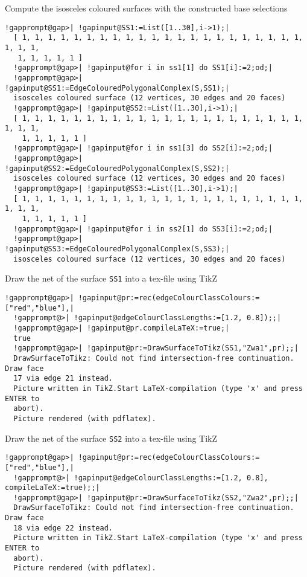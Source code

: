 \documentclass[a4paper,11pt]{report}
\begin{document}
{{ Compute the isosceles coloured surfaces with the constructed base selections 
\begin{Verbatim}[commandchars=!@|,fontsize=\small,frame=single,label=Example]
  !gapprompt@gap>| !gapinput@SS1:=List([1..30],i->1);|
  [ 1, 1, 1, 1, 1, 1, 1, 1, 1, 1, 1, 1, 1, 1, 1, 1, 1, 1, 1, 1, 1, 1, 1, 1, 1, 
   1, 1, 1, 1, 1 ]
  !gapprompt@gap>| !gapinput@for i in ss1[1] do SS1[i]:=2;od;|
  !gapprompt@gap>| !gapinput@SS1:=EdgeColouredPolygonalComplex(S,SS1);|
  isosceles coloured surface (12 vertices, 30 edges and 20 faces)
  !gapprompt@gap>| !gapinput@SS2:=List([1..30],i->1);|
  [ 1, 1, 1, 1, 1, 1, 1, 1, 1, 1, 1, 1, 1, 1, 1, 1, 1, 1, 1, 1, 1, 1, 1, 1, 1, 
    1, 1, 1, 1, 1 ]
  !gapprompt@gap>| !gapinput@for i in ss1[3] do SS2[i]:=2;od;|
  !gapprompt@gap>| !gapinput@SS2:=EdgeColouredPolygonalComplex(S,SS2);|
  isosceles coloured surface (12 vertices, 30 edges and 20 faces)
  !gapprompt@gap>| !gapinput@SS3:=List([1..30],i->1);|
  [ 1, 1, 1, 1, 1, 1, 1, 1, 1, 1, 1, 1, 1, 1, 1, 1, 1, 1, 1, 1, 1, 1, 1, 1, 1, 
    1, 1, 1, 1, 1 ]
  !gapprompt@gap>| !gapinput@for i in ss2[1] do SS3[i]:=2;od;|
  !gapprompt@gap>| !gapinput@SS3:=EdgeColouredPolygonalComplex(S,SS3);|
  isosceles coloured surface (12 vertices, 30 edges and 20 faces)
\end{Verbatim}
 

 Draw the net of the surface \texttt{SS1} into a tex-file using TikZ 

 
\begin{Verbatim}[commandchars=!@|,fontsize=\small,frame=single,label=Example]
  !gapprompt@gap>| !gapinput@pr:=rec(edgeColourClassColours:=["red","blue"],|
  !gapprompt@>| !gapinput@edgeColourClassLengths:=[1.2, 0.8]);;|
  !gapprompt@gap>| !gapinput@pr.compileLaTeX:=true;|
  true
  !gapprompt@gap>| !gapinput@pr:=DrawSurfaceToTikz(SS1,"Zwa1",pr);;|
  DrawSurfaceToTikz: Could not find intersection-free continuation. Draw face 
  17 via edge 21 instead.
  Picture written in TikZ.Start LaTeX-compilation (type 'x' and press ENTER to
  abort).
  Picture rendered (with pdflatex).
\end{Verbatim}
 

 
\begin{center}

\end{center}
 

 Draw the net of the surface \texttt{SS2} into a tex-file using TikZ 

 
\begin{Verbatim}[commandchars=!@|,fontsize=\small,frame=single,label=Example]
  !gapprompt@gap>| !gapinput@pr:=rec(edgeColourClassColours:=["red","blue"],|
  !gapprompt@>| !gapinput@edgeColourClassLengths:=[1.2, 0.8], compileLaTeX:=true);;|
  !gapprompt@gap>| !gapinput@pr:=DrawSurfaceToTikz(SS2,"Zwa2",pr);;|
  DrawSurfaceToTikz: Could not find intersection-free continuation. Draw face 
  18 via edge 22 instead.
  Picture written in TikZ.Start LaTeX-compilation (type 'x' and press ENTER to
  abort).
  Picture rendered (with pdflatex).
\end{Verbatim}
 

}}
\end{document}
